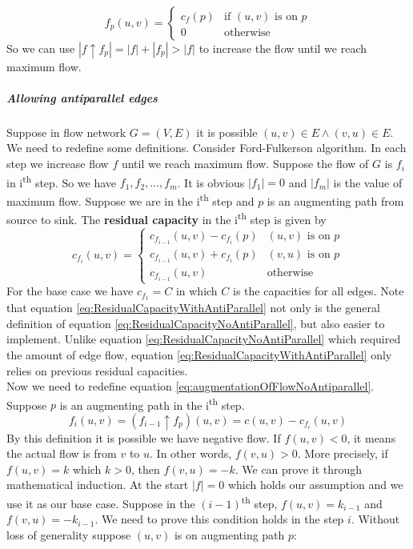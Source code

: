\documentclass{book}
\begin{document}
	\begin{equation*}
	f_p(u, v) = \begin{cases}
	c_f(p) & \text{if } (u, v) \text{ is on } p \\
	0 & \text{otherwise}
	\end{cases}
	\end{equation*}
	So we can use $|f \uparrow f_p| = |f| + |f_p| > |f|$ to increase the flow until we reach maximum flow.
	\subparagraph{Allowing antiparallel edges}
	Suppose in flow network $G = (V, E)$ it is possible $(u, v) \in E \land (v, u) \in E$. We need to redefine some definitions. Consider Ford-Fulkerson algorithm. In each step we increase flow $f$ until we reach maximum flow. Suppose the flow of $G$ is $f_i$ in i\textsuperscript{th} step. So we have $f_1, f_2, \dots, f_m$. It is obvious $|f_1| = 0$ and $|f_m|$ is the value of maximum flow. Suppose we are in the i\textsuperscript{th} step and $p$ is an augmenting path from source to sink. The \textbf{residual capacity} in the i\textsuperscript{th} step is given by
	\begin{equation}
	\label{eq:ResidualCapacityWithAntiParallel}
		c_{f_i}(u, v) = \begin{cases}
		c_{f_{i - 1}}(u, v) - c_{f_i}(p) & (u, v) \text{ is on } p \\
		c_{f_{i - 1}}(u, v) + c_{f_i}(p) & (v, u) \text{ is on } p \\
		c_{f_{i - 1}}(u, v) & \text{otherwise}
		\end{cases}
	\end{equation}
	For the base case we have $c_{f_1} = C$ in which $C$ is the capacities for all edges. Note that equation \ref{eq:ResidualCapacityWithAntiParallel} not only is the general definition of equation \ref{eq:ResidualCapacityNoAntiParallel}, but also easier to implement. Unlike equation \ref{eq:ResidualCapacityNoAntiParallel} which required the amount of edge flow, equation \ref{eq:ResidualCapacityWithAntiParallel} only relies on previous residual capacities.\\
	Now we need to redefine equation \ref{eq:augmentationOfFlowNoAntiparallel}. Suppose $p$ is an augmenting path in the i\textsuperscript{th} step.
	\begin{equation}
		f_i(u, v) = (f_{i - 1} \uparrow f_p)(u, v) = c(u, v) - c_{f_i}(u, v)
	\end{equation}
	By this definition it is possible we have negative flow. If $f(u, v) < 0$, it means the actual flow is from $v$ to $u$. In other words, $f(v, u) > 0$. More precisely, if $f(u, v) = k$ which $k > 0$, then $f(v, u) = -k$. We can prove it through mathematical induction. At the start $|f| = 0$ which holds our assumption and we use it as our base case. Suppose in the $(i - 1)$\textsuperscript{th} step, $f(u, v) = k_{i - 1}$ and $f(v, u) = -k_{i - 1}$. We need to prove this condition holds in the step $i$. Without loss of generality suppose $(u, v)$ is on augmenting path $p$:
\end{document}
